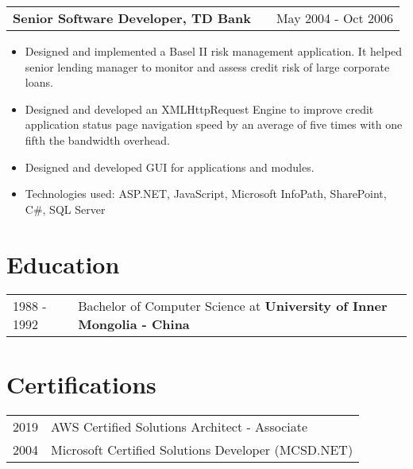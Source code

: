 \documentclass[a4paper,12pt]{article}
\makeatletter
\newenvironment{joblong}[2]
    {
    \begin{tabularx}{\linewidth}{@{}l X r@{}}
    \textbf{#1} & \hfill &  #2 \\[3.75pt]
    \end{tabularx}
    \begin{minipage}[t]{\linewidth}
    \begin{itemize}[nosep,after=\strut, leftmargin=1em, itemsep=3pt,label=--]
    }
    {
    \end{itemize}
    \end{minipage}    
    }
\makeatother
\begin{document}
\begin{joblong}{Senior Software Developer, TD Bank}{May 2004 - Oct 2006}
\item Designed and implemented a Basel II risk management application. It helped senior lending manager to monitor and assess credit risk of large corporate loans.
\item Designed and developed an XMLHttpRequest Engine to improve credit application status page navigation speed by an average of five times with one fifth the bandwidth overhead. 
\item Designed and developed GUI for applications and modules.
\item Technologies used: ASP.NET, JavaScript, Microsoft InfoPath, SharePoint, C\#, SQL Server
\end{joblong}

\section{Education}
\begin{tabularx}{\linewidth}{@{}l X@{}}	
1988 - 1992 & Bachelor of Computer Science at \textbf{University of Inner Mongolia - China} 
\end{tabularx}

\section{Certifications}
\begin{tabularx}{\linewidth}{@{}l X@{}}
2019 & AWS Certified Solutions Architect - Associate\\
2004 & Microsoft Certified Solutions Developer (MCSD.NET) 
\end{tabularx}


\vfill
{}
\end{document}
